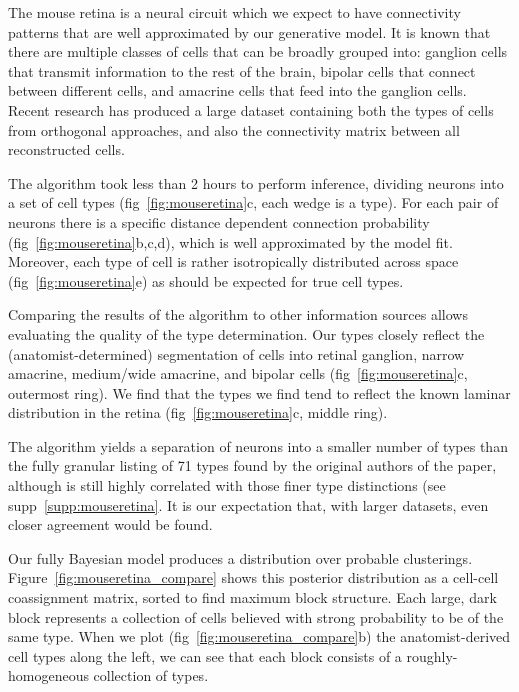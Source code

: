\documentclass{article}
\begin{document}
The mouse retina \autocite{Masland2001} is a neural circuit which we
expect to have connectivity patterns that are well approximated by our
generative model. It is known that there are multiple classes of cells
that can be broadly grouped into: ganglion cells that transmit
information to the rest of the brain, bipolar cells that connect
between different cells, and amacrine cells that feed into the
ganglion cells. Recent research \autocite{Helmstaedter2013} has
produced a large dataset containing both the types of cells from
orthogonal approaches, and also the connectivity matrix between all
reconstructed cells.

The algorithm took less than 2 hours to perform inference, dividing
neurons into a set of cell types (fig~\ref{fig:mouseretina}c, each
wedge is a type). For each pair of neurons there is a specific
distance dependent connection probability
(fig~\ref{fig:mouseretina}b,c,d), which is well approximated by the
model fit. Moreover, each type of cell is rather isotropically
distributed across space (fig~\ref{fig:mouseretina}e) as should be
expected for true cell types.

Comparing the results of the algorithm to other information sources
allows evaluating the quality of the type determination. Our types
closely reflect the (anatomist-determined) segmentation of cells into
retinal ganglion, narrow amacrine, medium/wide amacrine, and bipolar
cells (fig~\ref{fig:mouseretina}c, outermost ring). We find that the
types we find tend to reflect the known laminar distribution in the
retina (fig~\ref{fig:mouseretina}c, middle ring). 

The algorithm yields a separation of neurons into a smaller number of
types than the fully granular listing of 71 types found by the
original authors of the paper, although is still highly correlated
with those finer type distinctions (see
supp~\ref{supp:mouseretina}. It is our expectation that, with larger
datasets, even closer agreement would be found.

Our fully Bayesian model produces a distribution over probable
clusterings.  Figure~\ref{fig:mouseretina_compare} shows this
posterior distribution as a cell-cell coassignment matrix, sorted to
find maximum block structure. Each large, dark block represents a
collection of cells believed with strong probability to be of the same
type. When we plot (fig~\ref{fig:mouseretina_compare}b) the
anatomist-derived cell types along the left, we can see that each
block consists of a roughly-homogeneous collection of types. 
\end{document}
